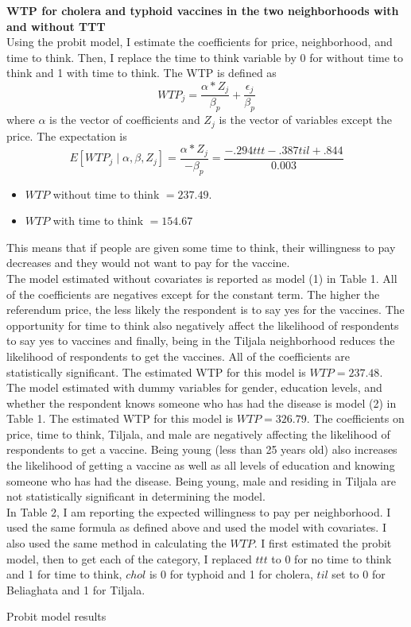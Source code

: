 \documentclass[12pt]{article}
\begin{document}
\begin{enumerate}
\textbf{WTP for cholera and typhoid vaccines in the two neighborhoods with and without TTT}\\
Using the probit model, I estimate the coefficients for price, neighborhood, and time to think. Then, I replace the time to think variable by 0 for without time to think and 1 with time to think. The WTP is defined as 
\[ WTP_j = \frac{\alpha*Z_j}{\beta_p} + \frac{\epsilon_j}{\beta_p} \]
where $\alpha$ is the vector of coefficients and $Z_j$ is the vector of variables except the price. The expectation is 
\[ E [WTP_j \mid \alpha,\beta,Z_j ] = \frac{\alpha*Z_j}{-\beta_p}=\frac{-.294ttt - .387til + .844}{0.003} \]
\begin{itemize}
\item $WTP$ without time to think $ = 237.49$.
\item $WTP$ with time to think $ = 154.67$ 
\end{itemize}
This means that if people are given some time to think, their willingness to pay decreases and they would not want to pay for the vaccine.\\
The model estimated without covariates is reported as model (1) in Table 1. All of the coefficients are negatives except for the constant term. The higher the referendum price, the less likely the respondent is to say yes for the vaccines. The opportunity for time to think also negatively affect the likelihood of respondents to say yes to vaccines and finally, being in the Tiljala neighborhood reduces the likelihood of respondents to get the vaccines. All of the coefficients are statistically significant. The estimated WTP for this model is $WTP = 237.48$.\\
The model estimated with dummy variables for gender, education levels, and whether the respondent knows someone who has had the disease is model (2) in Table 1. The estimated WTP for this model is $WTP = 326.79$. The coefficients on price, time to think, Tiljala, and male are negatively affecting the likelihood of respondents to get a vaccine. Being  young (less than 25 years old) also increases the likelihood of getting a vaccine as well as all levels of education and knowing someone who has had the disease. Being young, male and residing in Tiljala are not statistically significant in determining the model.\\
In Table 2, I am reporting the expected willingness to pay per neighborhood. I used the same formula as defined above and used the model with covariates. I also used the same method in calculating the $WTP$. I first estimated the probit model, then to get each of the category, I replaced $ttt$ to 0 for no time to think and 1 for time to think, $chol$ is 0 for typhoid and 1 for cholera, $til$ set to 0 for Beliaghata and 1 for Tiljala.\\
\FloatBarrier
\begin{table}[h]  
\caption{Probit model results}
{\label{tab:probit}}
\small

\end{table}


\end{enumerate}
\end{document}
